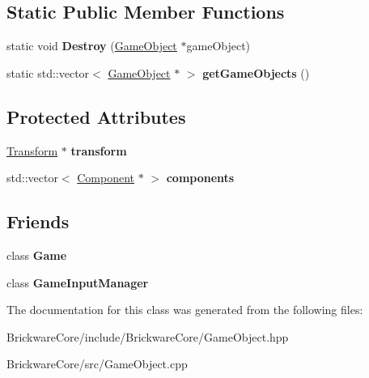 \subsection*{Static Public Member Functions}
\begin{DoxyCompactItemize}
\item 
\hypertarget{classBrickware_1_1Core_1_1GameObject_a1b73f9f6b6ba17874a8bc55e6eef2535}{}static void {\bfseries Destroy} (\hyperlink{classBrickware_1_1Core_1_1GameObject}{Game\+Object} $\ast$game\+Object)\label{classBrickware_1_1Core_1_1GameObject_a1b73f9f6b6ba17874a8bc55e6eef2535}

\item 
\hypertarget{classBrickware_1_1Core_1_1GameObject_a4ea5048c0fabb46aa5cb8a8acacb8e2e}{}static std\+::vector$<$ \hyperlink{classBrickware_1_1Core_1_1GameObject}{Game\+Object} $\ast$ $>$ {\bfseries get\+Game\+Objects} ()\label{classBrickware_1_1Core_1_1GameObject_a4ea5048c0fabb46aa5cb8a8acacb8e2e}

\end{DoxyCompactItemize}
\subsection*{Protected Attributes}
\begin{DoxyCompactItemize}
\item 
\hypertarget{classBrickware_1_1Core_1_1GameObject_ac87801b2575627a0fe880efdc3f90620}{}\hyperlink{classBrickware_1_1Core_1_1Transform}{Transform} $\ast$ {\bfseries transform}\label{classBrickware_1_1Core_1_1GameObject_ac87801b2575627a0fe880efdc3f90620}

\item 
\hypertarget{classBrickware_1_1Core_1_1GameObject_a4b15b7069c0de3837181264e8719e4d3}{}std\+::vector$<$ \hyperlink{classBrickware_1_1Core_1_1Component}{Component} $\ast$ $>$ {\bfseries components}\label{classBrickware_1_1Core_1_1GameObject_a4b15b7069c0de3837181264e8719e4d3}

\end{DoxyCompactItemize}
\subsection*{Friends}
\begin{DoxyCompactItemize}
\item 
\hypertarget{classBrickware_1_1Core_1_1GameObject_aa2fab026580d6f14280c2ffb8063a314}{}class {\bfseries Game}\label{classBrickware_1_1Core_1_1GameObject_aa2fab026580d6f14280c2ffb8063a314}

\item 
\hypertarget{classBrickware_1_1Core_1_1GameObject_ac47e2f0a982deffcf8368ec6cd1acce9}{}class {\bfseries Game\+Input\+Manager}\label{classBrickware_1_1Core_1_1GameObject_ac47e2f0a982deffcf8368ec6cd1acce9}

\end{DoxyCompactItemize}


The documentation for this class was generated from the following files\+:\begin{DoxyCompactItemize}
\item 
Brickware\+Core/include/\+Brickware\+Core/Game\+Object.\+hpp\item 
Brickware\+Core/src/Game\+Object.\+cpp\end{DoxyCompactItemize}
